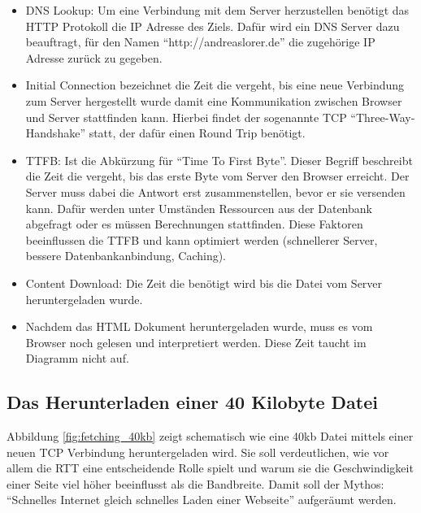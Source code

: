 			\begin{itemize}
				\item DNS Lookup: Um eine Verbindung mit dem Server herzustellen benötigt das HTTP Protokoll die IP Adresse des Ziels. Dafür wird ein DNS Server dazu beauftragt, für den Namen "`http://andreaslorer.de"' die zugehörige IP Adresse zurück zu gegeben.

				\item Initial Connection bezeichnet die Zeit die vergeht, bis eine neue Verbindung zum Server hergestellt wurde damit eine Kommunikation zwischen Browser und Server stattfinden kann. Hierbei findet der sogenannte TCP "`Three-Way-Handshake"' statt, der dafür einen Round Trip benötigt.

				\item TTFB: Ist die Abkürzung für "`Time To First Byte"'. Dieser Begriff beschreibt die Zeit die vergeht, bis das erste Byte vom Server den Browser erreicht. Der Server muss dabei die Antwort erst zusammenstellen, bevor er sie versenden kann. Dafür werden unter Umständen Ressourcen aus der Datenbank abgefragt oder es müssen Berechnungen stattfinden. Diese Faktoren beeinflussen die TTFB und kann optimiert werden (schnellerer Server, bessere Datenbankanbindung, Caching).

				\item Content Download: Die Zeit die benötigt wird bis die Datei vom Server heruntergeladen wurde.

				\item Nachdem das HTML Dokument heruntergeladen wurde, muss es vom Browser noch gelesen und interpretiert werden. Diese Zeit taucht im Diagramm nicht auf.
			\end{itemize}
					

	\subsection{Das Herunterladen einer 40 Kilobyte Datei} %
	\label{sub:das_herunterladen_einer_40_kb_datei}
		Abbildung \ref{fig:fetching_40kb} zeigt schematisch wie eine 40kb Datei mittels einer neuen TCP Verbindung heruntergeladen wird. Sie soll verdeutlichen, wie vor allem die RTT eine entscheidende Rolle spielt und warum sie die Geschwindigkeit einer Seite viel höher beeinflusst als die Bandbreite. Damit soll der Mythos: "`Schnelles Internet gleich schnelles Laden einer Webseite"' aufgeräumt werden.


